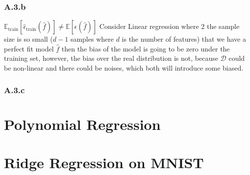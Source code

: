 \documentclass[]{article}
\begin{document}
    \subsubsection*{A.3.b}
        $\mathbb{E}_{\text{train}}\left[\hat{\epsilon}_\text{train}(\hat{f})\right]\ne \mathbb{E}\left[\epsilon(\hat{f})\right]$ Consider Linear regression where 2 the sample size is so small ($d - 1$ samples where $d$ is the number of features) that we have a perfect fit model $\hat{f}$ then the bias of the model is going to be zero under the training set, however, the bias over the real distribution is not, because $\mathcal{D}$ could be non-linear and there could be noises, which both will introduce some biased. 
    \subsubsection*{A.3.c}

\section*{Polynomial Regression}

\section*{Ridge Regression on MNIST}
\end{document}
